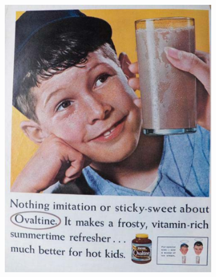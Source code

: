 \begin{figure}
    \centering
    \begin{subfigure}[b]{0.3\textwidth}
         \centering
         \includegraphics[width=\textwidth,scale=0.6]{images/humans_concreteness_img1.pdf}
         \caption{}
         

\end{subfigure}
\end{figure}
